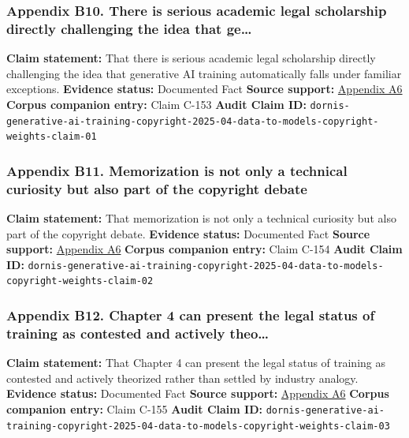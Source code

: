 \documentclass[
  american,
  11pt,
  letterpaper,
]{article}
\begin{document}
\subsubsection{Appendix B10. There is serious academic legal scholarship
directly challenging the idea that
ge\ldots{}}\label{appendix-b10-there-is-serious-academic-legal-scholarship-directly-challenging-the-idea-that-ge}

\textbf{Claim statement:} That there is serious academic legal
scholarship directly challenging the idea that generative AI training
automatically falls under familiar exceptions. \textbf{Evidence status:}
Documented Fact \textbf{Source support:}
\hyperref[appendix-a6-generative-ai-training-and-copyright-law]{Appendix
A6} \textbf{Corpus companion entry:} Claim C-153 \textbf{Audit Claim
ID:}
\texttt{dornis-generative-ai-training-copyright-2025-04-data-to-models-copyright-weights-claim-01}

\subsubsection{Appendix B11. Memorization is not only a technical
curiosity but also part of the copyright
debate}\label{appendix-b11-memorization-is-not-only-a-technical-curiosity-but-also-part-of-the-copyright-debate}

\textbf{Claim statement:} That memorization is not only a technical
curiosity but also part of the copyright debate. \textbf{Evidence
status:} Documented Fact \textbf{Source support:}
\hyperref[appendix-a6-generative-ai-training-and-copyright-law]{Appendix
A6} \textbf{Corpus companion entry:} Claim C-154 \textbf{Audit Claim
ID:}
\texttt{dornis-generative-ai-training-copyright-2025-04-data-to-models-copyright-weights-claim-02}

\subsubsection{Appendix B12. Chapter 4 can present the legal status of
training as contested and actively
theo\ldots{}}\label{appendix-b12-chapter-4-can-present-the-legal-status-of-training-as-contested-and-actively-theo}

\textbf{Claim statement:} That Chapter 4 can present the legal status of
training as contested and actively theorized rather than settled by
industry analogy. \textbf{Evidence status:} Documented Fact
\textbf{Source support:}
\hyperref[appendix-a6-generative-ai-training-and-copyright-law]{Appendix
A6} \textbf{Corpus companion entry:} Claim C-155 \textbf{Audit Claim
ID:}
\texttt{dornis-generative-ai-training-copyright-2025-04-data-to-models-copyright-weights-claim-03}
\end{document}
